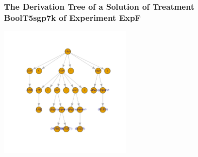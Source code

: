  \begin{frame}
 \frametitle{ The Derivation Tree of a Solution of Treatment BoolT5sgp7k of Experiment ExpF }
 \begin{center}
\includegraphics[width=0.5\textwidth, angle=0]
{ExpFDerivationTreeFigure008.pdf}
 \end{center}
 \label{report/ExpFDerivationTreeFigure008.pdf}  
 \end{frame}

